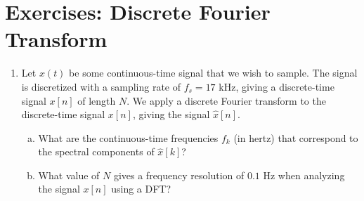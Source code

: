 \newpage
\section{Exercises: Discrete Fourier Transform}

\begin{enumerate}
\item Let $x(t)$ be some continuous-time signal that we wish to sample. The signal is discretized with a sampling rate of $f_{s}=17$ kHz, giving a discrete-time signal $x[n]$ of length $N$. We apply a discrete Fourier transform to the discrete-time signal $x[n]$, giving the signal $\hat{x}[n]$. 

\begin{enumerate}[a)]
    \item What are the continuous-time frequencies $f_{k}$ (in hertz) that correspond to the spectral components of $\hat{x}[k]$?
    
    \item What value of $N$ gives a frequency resolution of $0.1$ Hz when analyzing the signal $x[n]$ using a DFT?
\end{enumerate}


\end{enumerate}